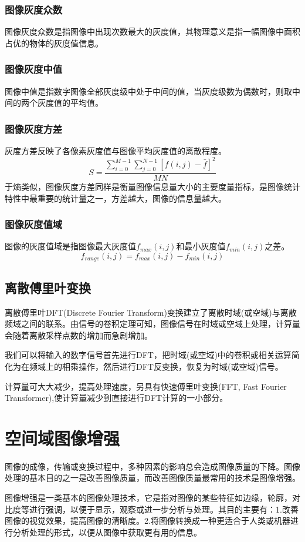 \documentclass[11pt]{article}
\begin{document}
\subsubsection{图像灰度众数}
图像灰度众数是指图像中出现次数最大的灰度值，其物理意义是指一幅图像中面积占优的物体的灰度值信息。
\subsubsection{图像灰度中值}
图像中值是指数字图像全部灰度级中处于中间的值，当灰度级数为偶数时，则取中间的两个灰度值的平均值。
\subsubsection{图像灰度方差}
灰度方差反映了各像素灰度值与图像平均灰度值的离散程度。
$$S = \frac{\sum_{i=0}^{M-1}\sum_{j=0}^{N-1}[f(i,j)-\bar{f}]^2}{MN}$$
于熵类似，图像灰度方差同样是衡量图像信息量大小的主要度量指标，是图像统计特性中最重要的统计量之一，方差越大，图像的信息量越大。
\subsubsection{图像灰度值域}
图像的灰度值域是指图像最大灰度值$f_{max}(i,j)$和最小灰度值$f_{min}(i,j)$之差。
$$f_{range}(i,j) = f_{max}(i,j) - f_{min}(i,j)$$

\subsection{离散傅里叶变换}
离散傅里叶DFT(Discrete Fourier Transform)变换建立了离散时域(或空域)与离散频域之间的联系。由信号的卷积定理可知，图像信号在时域或空域上处理，计算量会随着离散采样点数的增加而急剧增加。

我们可以将输入的数字信号首先进行DFT，把时域(或空域)中的卷积或相关运算简化为在频域上的相乘操作，然后进行DFT反变换，恢复为时域(或空域)信号。

计算量可大大减少，提高处理速度，另具有快速傅里叶变换(FFT, Fast Fourier Transformer),使计算量减少到直接进行DFT计算的一小部分。


\section{空间域图像增强}
图像的成像，传输或变换过程中，多种因素的影响总会造成图像质量的下降。图像处理的基本目的之一是改善图像质量，而改善图像质量最常用的技术是图像增强。

图像增强是一类基本的图像处理技术，它是指对图像的某些特征如边缘，轮廓，对比度等进行强调，以便于显示，观察或进一步分析与处理。其目的主要有：1.改善图像的视觉效果，提高图像的清晰度。2.将图像转换成一种更适合于人类或机器进行分析处理的形式，以便从图像中获取更有用的信息。
\end{document}

